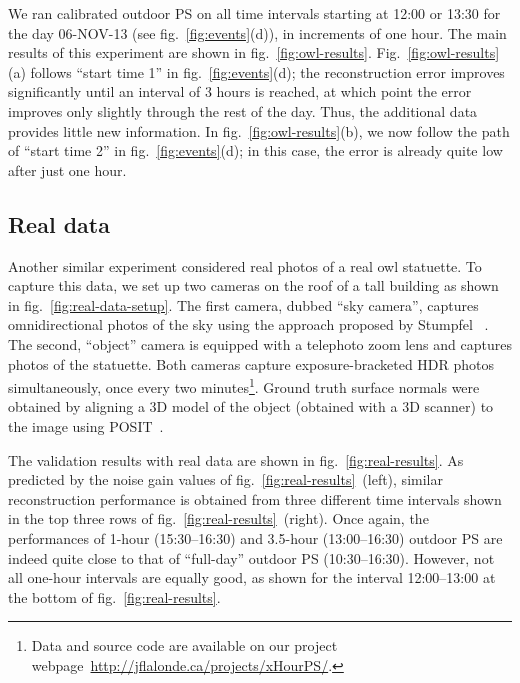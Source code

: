 
We ran calibrated outdoor PS on all time intervals starting at 12:00 or 13:30 for the day 06-NOV-13 (see fig.~\ref{fig:events}(d)), in increments of one hour. The main results of this experiment are shown in fig.~\ref{fig:owl-results}. Fig.~\ref{fig:owl-results}(a) follows ``start time 1'' in fig.~\ref{fig:events}(d); the reconstruction error improves significantly until an interval of 3 hours is reached, at which point the error improves only slightly through the rest of the day. Thus, the additional data provides little new information. In fig.~\ref{fig:owl-results}(b), we now follow the path of ``start time 2'' in fig.~\ref{fig:events}(d); in this case, the error is already quite low after just one hour. 
%

\subsection{Real data}%
%
Another similar experiment considered real photos of a real owl statuette. To capture this data, we set up two cameras on the roof of a tall building as shown in fig.~\ref{fig:real-data-setup}. The first camera, dubbed ``sky camera'', captures omnidirectional photos of the sky using the approach proposed by Stumpfel \etal~\cite{stumpfel-afrigraph-04}. The second, ``object'' camera is equipped with a telephoto zoom lens and captures photos of the statuette. Both cameras capture exposure-bracketed HDR photos simultaneously, once every two minutes\footnote{Data and source code are available on our project webpage~\url{http://jflalonde.ca/projects/xHourPS/}.}. Ground truth surface normals were obtained by aligning a 3D model of the object (obtained with a 3D scanner) to the image using POSIT~\cite{dementhon-ijcv-95}. 

The validation results with real data are shown in fig.~\ref{fig:real-results}. As predicted by the noise gain values of fig.~\ref{fig:real-results}~(left), similar reconstruction performance is obtained from three different time intervals shown in the top three rows of fig.~\ref{fig:real-results}~(right). Once again, the performances of 1-hour (15:30--16:30) and 3.5-hour (13:00--16:30) outdoor PS are indeed quite close to that of ``full-day'' outdoor PS (10:30--16:30). However, not all one-hour intervals are equally good, as shown for the interval 12:00--13:00 at the bottom of fig.~\ref{fig:real-results}.


